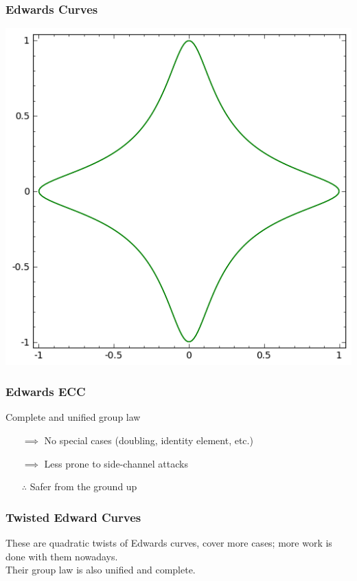 \documentclass[xcolor=dvipsnames, handout]{beamer}
\begin{document}
\begin{frame}
    \frametitle{Edwards Curves}
    \begin{center}
    \includegraphics[scale=.5]{ec1.png}
    \end{center}
\end{frame}

\begin{frame}
    \frametitle{Edwards ECC}
    Complete and unified group law
    \begin{enumerate}
        \pause
        \item[$\implies$] No special cases (doubling, identity element, etc.)
        \pause
        \item[$\implies$] Less prone to side-channel attacks
        \pause
        \item[$\therefore$] Safer from the ground up
    \end{enumerate}
\end{frame}

\begin{frame}
    \frametitle{Twisted Edward Curves}
    These are quadratic twists of Edwards curves, cover more cases; more work
        is done with them nowadays.\\
    \alert{Their group law is also unified and complete.}
\end{frame}
\end{document}
